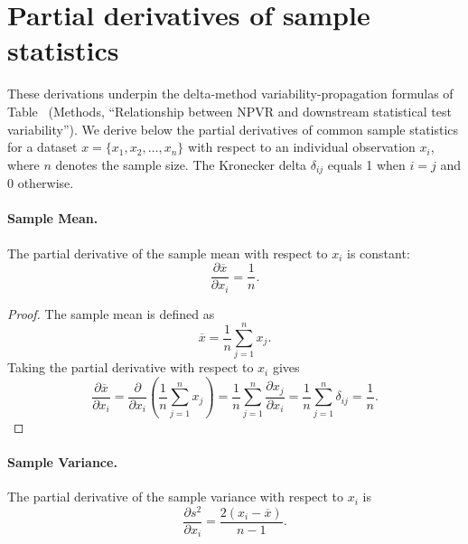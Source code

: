 \section{Partial derivatives of sample statistics\label{appendix:partial_derivatives_proofs}}

These derivations underpin the delta-method variability-propagation formulas of
Table~ (Methods, ``Relationship between NPVR
and downstream statistical test variability''). We derive below the partial
derivatives of common sample statistics for a
dataset \(x = \{x_1, x_2, \ldots, x_n\}\) with respect to an individual
observation \(x_i\), where \(n\) denotes the sample size. The Kronecker delta
\(\delta_{ij}\) equals 1 when \(i = j\) and 0 otherwise.

\paragraph{Sample Mean.}
The partial derivative of the sample mean with respect to \(x_i\) is constant:
\begin{equation}
    \frac{\partial \overline{x}}{\partial x_i} = \frac{1}{n}.
    \label{eq:sample_mean_derivative}
\end{equation}

\begin{proof}
    The sample mean is defined as
    \[
        \overline{x} = \frac{1}{n} \sum_{j=1}^{n} x_j.
    \]
    Taking the partial derivative with respect to \(x_i\) gives
    \[
        \frac{\partial \overline{x}}{\partial x_i}
        = \frac{\partial}{\partial x_i} \left( \frac{1}{n} \sum_{j=1}^{n} x_j \right)
        = \frac{1}{n} \sum_{j=1}^{n} \frac{\partial x_j}{\partial x_i}
        = \frac{1}{n} \sum_{j=1}^{n} \delta_{ij}
        = \frac{1}{n}.
    \]
\end{proof}

\paragraph{Sample Variance.}

The partial derivative of the sample variance with respect to \(x_i\) is
\begin{equation}
    \frac{\partial s^2}{\partial x_i} = \frac{2(x_i - \overline{x})}{n-1}.
    \label{eq:sample_variance_derivative}
\end{equation}


